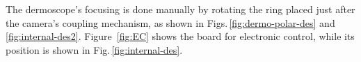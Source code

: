 The dermoscope's focusing is done manually by rotating the ring placed just after the camera's coupling mechanism, as shown in Figs.\,\ref{fig:dermo-polar-des} and \ref{fig:internal-des2}.
Figure~\ref{fig:EC} shows the board for electronic control, while its position is shown in Fig.\,\ref{fig:internal-des}.






